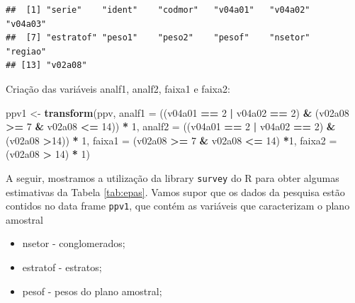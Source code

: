 \documentclass[]{book}
\newenvironment{Shaded}{\begin{snugshade}}{\end{snugshade}}
\newcommand{\KeywordTok}[1]{\textcolor[rgb]{0.13,0.29,0.53}{\textbf{#1}}}
\newcommand{\DataTypeTok}[1]{\textcolor[rgb]{0.13,0.29,0.53}{#1}}
\newcommand{\DecValTok}[1]{\textcolor[rgb]{0.00,0.00,0.81}{#1}}
\newcommand{\StringTok}[1]{\textcolor[rgb]{0.31,0.60,0.02}{#1}}
\newcommand{\OperatorTok}[1]{\textcolor[rgb]{0.81,0.36,0.00}{\textbf{#1}}}
\newcommand{\NormalTok}[1]{#1}
\providecommand{\tightlist}{%
  \setlength{\itemsep}{0pt}\setlength{\parskip}{0pt}}
\theoremstyle{definition}
\theoremstyle{definition}
\theoremstyle{definition}
\theoremstyle{remark}
\begin{document}
\begin{verbatim}
##  [1] "serie"    "ident"    "codmor"   "v04a01"   "v04a02"   "v04a03"  
##  [7] "estratof" "peso1"    "peso2"    "pesof"    "nsetor"   "regiao"  
## [13] "v02a08"
\end{verbatim}

Criação das variáveis analf1, analf2, faixa1 e faixa2:

\begin{Shaded}
\begin{Highlighting}[]
\NormalTok{ppv1 <-}\StringTok{ }\KeywordTok{transform}\NormalTok{(ppv, }
\DataTypeTok{analf1 =}\NormalTok{ ((v04a01 }\OperatorTok{==}\StringTok{ }\DecValTok{2} \OperatorTok{|}\StringTok{ }\NormalTok{v04a02 }\OperatorTok{==}\StringTok{ }\DecValTok{2}\NormalTok{) }\OperatorTok{&}\StringTok{ }\NormalTok{(v02a08 }\OperatorTok{>=}\StringTok{ }\DecValTok{7} \OperatorTok{&}\StringTok{ }\NormalTok{v02a08 }\OperatorTok{<=}\StringTok{ }\DecValTok{14}\NormalTok{)) }\OperatorTok{*}\StringTok{ }\DecValTok{1}\NormalTok{, }
\DataTypeTok{analf2 =}\NormalTok{ ((v04a01 }\OperatorTok{==}\StringTok{ }\DecValTok{2} \OperatorTok{|}\StringTok{ }\NormalTok{v04a02 }\OperatorTok{==}\StringTok{ }\DecValTok{2}\NormalTok{) }\OperatorTok{&}\StringTok{ }\NormalTok{(v02a08 }\OperatorTok{>}\DecValTok{14}\NormalTok{)) }\OperatorTok{*}\StringTok{ }\DecValTok{1}\NormalTok{, }
\DataTypeTok{faixa1 =}\NormalTok{ (v02a08 }\OperatorTok{>=}\StringTok{ }\DecValTok{7} \OperatorTok{&}\StringTok{ }\NormalTok{v02a08 }\OperatorTok{<=}\StringTok{ }\DecValTok{14}\NormalTok{) }\OperatorTok{*}\DecValTok{1}\NormalTok{, }
\DataTypeTok{faixa2 =}\NormalTok{ (v02a08 }\OperatorTok{>}\StringTok{ }\DecValTok{14}\NormalTok{) }\OperatorTok{*}\StringTok{ }\DecValTok{1}\NormalTok{)}
\end{Highlighting}
\end{Shaded}

A seguir, mostramos a utilização da library \texttt{survey}
\citep{R-survey} do R para obter algumas estimativas da Tabela
\ref{tab:epas}. Vamos supor que os dados da pesquisa estão contidos no
data frame \texttt{ppv1}, que contém as variáveis que caracterizam o
plano amostral

\begin{itemize}
\tightlist
\item
  nsetor - conglomerados;
\item
  estratof - estratos;
\item
  pesof - pesos do plano amostral;
\end{itemize}
\end{document}
